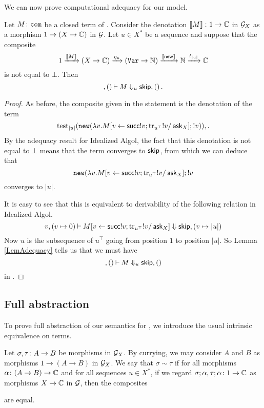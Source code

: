 \documentclass{article}
\begin{document}
We can now prove computational adequacy for our model.

\begin{proposition}
  Let $M\colon {\mathtt{com}}$ be a closed term of \IAX.  
  Consider the denotation $\left\llbracket M\right\rrbracket\colon 1 \to \mathbb{C}$ in $\mathcal G_X$ as a morphism $1 \to (X \to \mathbb{C})$ in $\mathcal G$.  
  Let $u\in X^*$ be a sequence and suppose that the composite
  \[
    1 \xrightarrow{\left\llbracket M\right\rrbracket}
    (X \to \mathbb{C}) \xrightarrow{\eta_u}
    ({\mathtt{Var}} \to \mathbb{N}) \xrightarrow{\left\llbracket\operatorname{{\mathsf{new}}}\right\rrbracket}
    \mathbb{N} \xrightarrow{t_{|u|}}
    \mathbb{C}
    \]
  is not equal to $\bot$.  
  Then
  \[
    ,()\mathbin{\vdash} M\Downarrow_u {\mathsf{skip}},()\,.
    \]
  \label{PropKleisliAdequacy}
\end{proposition}
\begin{proof}
  As before, the composite given in the statement is the denotation of the term
  \[
    \operatorname{test}_{|u|} ({\mathtt{new}} (\lambda v.M[v\gets \operatorname{{\mathsf{succ}}} !v;\operatorname{tr}_{u^\top} !v/\operatorname{{\mathsf{ask}}}_X];!v))\\,.
    \]
  By the adequacy result for Idealized Algol, the fact that this denotation is not equal to $\bot$ means that the term converges to ${\mathsf{skip}}$, from which we can deduce that
  \[
    {\mathtt{new}} (\lambda v.M[v\gets \operatorname{{\mathsf{succ}}} !v;\operatorname{tr}_{u^\top} !v/\operatorname{{\mathsf{ask}}}_X];!v
    \]
  converges to $|u|$.

  It is easy to see that this is equivalent to derivability of the following relation in Idealized Algol.
  \[
    v,(v\mapsto 0) \mathbin{\vdash} M[v\gets \operatorname{{\mathsf{succ}}} !v;\operatorname{tr}_{u^\top} !v/\operatorname{{\mathsf{ask}}}_X] \Downarrow {\mathsf{skip}},(v\mapsto |u|)
    \]
  Now $u$ is the subsequence of $u^\top$ going from position $1$ to position $|u|$.  
  So Lemma \ref{LemAdequacy} tells us that we must have
  \[
    ,()\mathbin{\vdash} M \Downarrow_u {\mathsf{skip}},()
    \]
  in \IAX.
\end{proof}

\subsection{Full abstraction}

To prove full abstraction of our semantics for \IAX, we introduce the usual intrinsic equivalence on terms.

\begin{definition}
  Let $\sigma,\tau\colon A \to B$ be morphisms in $\mathcal G_X$.  
  By currying, we may consider $A$ and $B$ as morphisms $1 \to (A \to B)$ in $\mathcal G_X$.
  We say that $\sigma\sim\tau$ if for all morphisms $\alpha\colon (A \to B) \to \mathbb{C}$ and for all sequences $u\in X^*$, if we regard $\sigma;\alpha,\tau;\alpha\colon 1 \to \mathbb{C}$ as morphisms $X \to \mathbb{C}$ in $\mathcal G$, then the composites
  are equal.
\end{definition}
\end{document}
